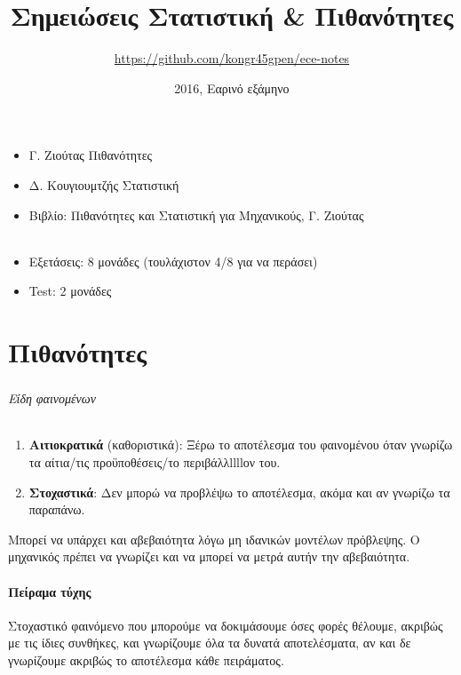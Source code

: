 \documentclass[11pt,a4paper,titlepage,draft]{article}
\title{Σημειώσεις Στατιστική \& Πιθανότητες}
\date{2016, Εαρινό εξάμηνο}
\author{\textlatin{\url{https://github.com/kongr45gpen/ece-notes}}}
\newcommand{\textlatin}[1]{#1}
\begin{document}
\maketitle

\tableofcontents

\newpage

\begin{itemize}
\item Γ. Ζιούτας Πιθανότητες
\item Δ. Κουγιουμτζής Στατιστική
\item Βιβλίο: Πιθανότητες και Στατιστική για Μηχανικούς, Γ. Ζιούτας
\end{itemize}

\paragraph{}

\begin{itemize}
\item Εξετάσεις: 8 μονάδες (τουλάχιστον 4/8 για να περάσει)
\item \textlatin{Test}: 2 μονάδες
\end{itemize}

\part{Πιθανότητες}

\section{}
\paragraph{Είδη φαινομένων}

\begin{enumerate}
\item \textbf{Αιτιοκρατικά} (καθοριστικά): Ξέρω το αποτέλεσμα του φαινομένου όταν γνωρίζω τα αίτια/τις προϋποθέσεις/το περιβάλλllllον του.
\item \textbf{Στοχαστικά}: Δεν μπορώ να προβλέψω το αποτέλεσμα, ακόμα και αν γνωρίζω τα παραπάνω.
\end{enumerate}
Μπορεί να υπάρχει και αβεβαιότητα λόγω μη ιδανικών μοντέλων πρόβλεψης. Ο μηχανικός πρέπει να γνωρίζει και να μπορεί να μετρά αυτήν την αβεβαιότητα.

\subsection{Πείραμα τύχης}
Στοχαστικό φαινόμενο που μπορούμε να δοκιμάσουμε όσες φορές θέλουμε, ακριβώς με τις ίδιες συνθήκες, και γνωρίζουμε όλα τα δυνατά αποτελέσματα, αν και δε γνωρίζουμε ακριβώς το αποτέλεσμα κάθε πειράματος.
\end{document}
